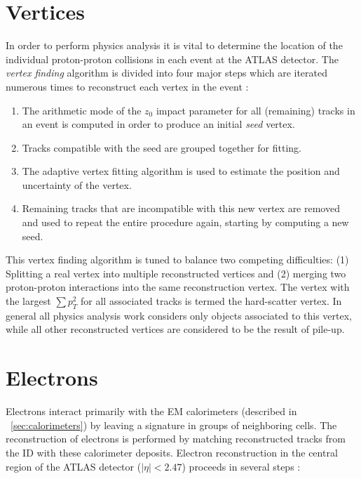 \section{Vertices}
In order to perform physics analysis it is vital to determine the location of the individual proton-proton collisions in each event at the ATLAS detector.
The \textit{vertex finding} algorithm is divided into four major steps which are iterated numerous times to reconstruct each vertex in the event  \cite{Borissov:2015djv}:
\begin{enumerate}
    \item 
        The arithmetic mode of the $z_0$ impact parameter for all (remaining) tracks in an event is computed in order to produce an initial \textit{seed} vertex.
    \item 
        Tracks compatible with the seed are grouped together for fitting.
    \item 
        The adaptive vertex fitting algorithm is used to estimate the position and uncertainty of the vertex.
    \item
        Remaining tracks that are incompatible with this new vertex are removed and used to repeat the entire procedure again, starting by computing a new seed.
\end{enumerate}
This vertex finding algorithm is tuned to balance two competing difficulties: (1) Splitting a real vertex into multiple reconstructed vertices and (2) merging two proton-proton interactions into the same reconstruction vertex. 
The vertex with the largest $\sum p_T^2$ for all associated tracks is termed the hard-scatter vertex. In general all physics analysis work considers only objects associated to this vertex, while all other reconstructed vertices are considered to be the result of pile-up.

\section{Electrons}
Electrons interact primarily with the EM calorimeters (described in ~\ref{sec:calorimeters}) by leaving a signature in groups of neighboring cells.
The reconstruction of electrons is performed by matching reconstructed tracks from the ID with these calorimeter deposits.
Electron reconstruction in the central region of the ATLAS detector ($|\eta| < 2.47$) proceeds in several steps \cite{ATLAS-CONF-2016-024}:

